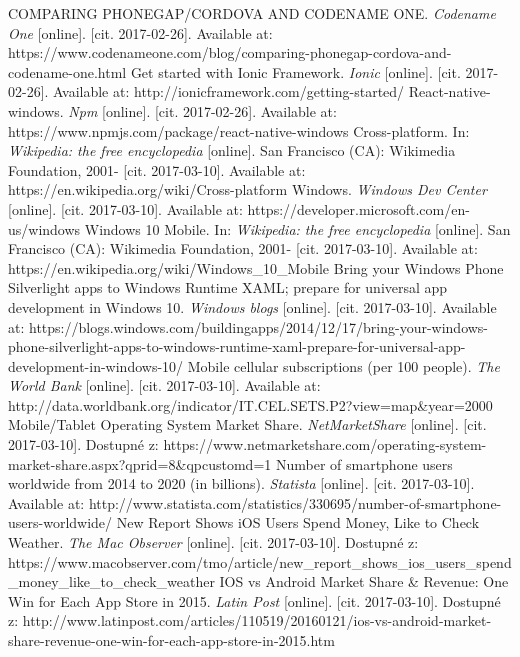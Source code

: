 \documentclass[english,master,public,dept460,male,cpdeclaration,oneside]{diploma}
\begin{document}
\begin{thebibliography}{99}
	 COMPARING PHONEGAP/CORDOVA AND CODENAME ONE. \textit{Codename One} [online]. [cit. 2017-02-26]. Available at: https://www.codenameone.com/blog/comparing-phonegap-cordova-and-codename-one.html	
	 Get started with Ionic Framework. \textit{Ionic} [online]. [cit. 2017-02-26]. Available at: http://ionicframework.com/getting-started/	
	 React-native-windows. \textit{Npm} [online]. [cit. 2017-02-26]. Available at: https://www.npmjs.com/package/react-native-windows
	 Cross-platform. In: \textit{Wikipedia: the free encyclopedia} [online]. San Francisco (CA): Wikimedia Foundation, 2001- [cit. 2017-03-10]. Available at: https://en.wikipedia.org/wiki/Cross-platform
	 Windows. \textit{Windows Dev Center} [online]. [cit. 2017-03-10]. Available at: https://developer.microsoft.com/en-us/windows
	 Windows 10 Mobile. In: \textit{Wikipedia: the free encyclopedia} [online]. San Francisco (CA): Wikimedia Foundation, 2001- [cit. 2017-03-10]. Available at: https://en.wikipedia.org/wiki/Windows\_10\_Mobile
	 Bring your Windows Phone Silverlight apps to Windows Runtime XAML; prepare for universal app development in Windows 10. \textit{Windows blogs} [online]. [cit. 2017-03-10]. Available at: https://blogs.windows.com/buildingapps/2014/12/17/bring-your-windows-phone-silverlight-apps-to-windows-runtime-xaml-prepare-for-universal-app-development-in-windows-10/
	 Mobile cellular subscriptions (per 100 people). \textit{The World Bank} [online]. [cit. 2017-03-10]. Available at: http://data.worldbank.org/indicator/IT.CEL.SETS.P2?view=map\&year=2000
	 Mobile/Tablet Operating System Market Share. \textit{NetMarketShare} [online]. [cit. 2017-03-10]. Dostupné z: https://www.netmarketshare.com/operating-system-market-share.aspx?qprid=8\&qpcustomd=1
	 Number of smartphone users worldwide from 2014 to 2020 (in billions). \textit{Statista} [online]. [cit. 2017-03-10]. Available at: http://www.statista.com/statistics/330695/number-of-smartphone-users-worldwide/
	 New Report Shows iOS Users Spend Money, Like to Check Weather. \textit{The Mac Observer} [online]. [cit. 2017-03-10]. Dostupné z: https://www.macobserver.com/tmo/article/new\_report\_shows\_ios\_users\_spend\_money\_like\_to\_check\_weather
	 IOS vs Android Market Share \& Revenue: One Win for Each App Store in 2015. \textit{Latin Post} [online]. [cit. 2017-03-10]. Dostupné z: http://www.latinpost.com/articles/110519/20160121/ios-vs-android-market-share-revenue-one-win-for-each-app-store-in-2015.htm

\end{thebibliography}
\end{document}
